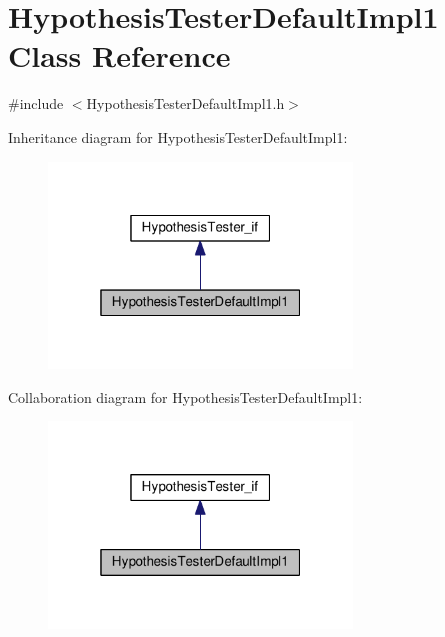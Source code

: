 \hypertarget{class_hypothesis_tester_default_impl1}{}\section{Hypothesis\+Tester\+Default\+Impl1 Class Reference}
\label{class_hypothesis_tester_default_impl1}


{\ttfamily \#include $<$Hypothesis\+Tester\+Default\+Impl1.\+h$>$}



Inheritance diagram for Hypothesis\+Tester\+Default\+Impl1\+:
\nopagebreak
\begin{figure}[H]
\begin{center}
\leavevmode
\includegraphics[width=229pt]{class_hypothesis_tester_default_impl1__inherit__graph}
\end{center}
\end{figure}


Collaboration diagram for Hypothesis\+Tester\+Default\+Impl1\+:
\nopagebreak
\begin{figure}[H]
\begin{center}
\leavevmode
\includegraphics[width=229pt]{class_hypothesis_tester_default_impl1__coll__graph}
\end{center}
\end{figure}

